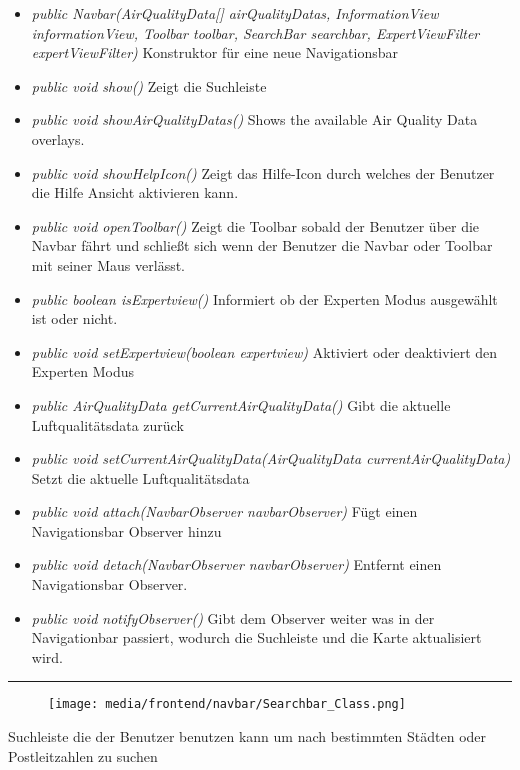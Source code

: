 \begin{itemize} 
    \item \emph{public Navbar(AirQualityData[] airQualityDatas, InformationView informationView, Toolbar toolbar, SearchBar searchbar, ExpertViewFilter expertViewFilter)} Konstruktor für eine neue Navigationsbar
    \item \emph{public void show()} Zeigt die Suchleiste
    \item \emph{public void showAirQualityDatas()} Shows the available Air Quality Data overlays.
    \item \emph{public void showHelpIcon()} Zeigt das Hilfe-Icon durch welches der Benutzer die Hilfe Ansicht aktivieren kann.
    \item \emph{public void openToolbar()} Zeigt die Toolbar sobald der Benutzer über die Navbar fährt und schließt sich wenn der Benutzer die Navbar oder Toolbar mit seiner Maus verlässt. 
    \item \emph{public boolean isExpertview()} Informiert ob der Experten Modus ausgewählt ist oder nicht.
    \item \emph{public void setExpertview(boolean expertview)} Aktiviert oder deaktiviert den Experten Modus
    \item \emph{public AirQualityData getCurrentAirQualityData()} Gibt die aktuelle Luftqualitätsdata zurück
    \item \emph{public void setCurrentAirQualityData(AirQualityData currentAirQualityData)} Setzt die aktuelle Luftqualitätsdata
    \item \emph{public void attach(NavbarObserver navbarObserver)} Fügt einen Navigationsbar Observer hinzu
    \item \emph{public void detach(NavbarObserver navbarObserver)} Entfernt einen Navigationsbar Observer.
    \item \emph{public void notifyObserver()} Gibt dem Observer weiter was in der Navigationbar passiert, wodurch die Suchleiste und die Karte aktualisiert wird.
\end{itemize}

\rule{\textwidth}{0.4pt} 
\begin{minipage}{0.3\textwidth}
    \begin{figure}[H]
        \texttt{[image: media/frontend/navbar/Searchbar\_Class.png]}
    \end{figure}
    \end{minipage} \hfill
    \begin{minipage}{0.6\textwidth}
Suchleiste die der Benutzer benutzen kann um nach bestimmten Städten oder Postleitzahlen zu suchen
\end{minipage}

